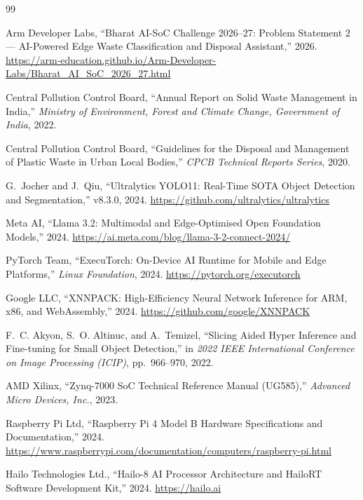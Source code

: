 \documentclass[12pt,a4paper]{article}
\begin{document}
\clearpage

\begin{thebibliography}{99}

Arm Developer Labs,
``Bharat AI-SoC Challenge 2026--27: Problem Statement 2 --- AI-Powered Edge Waste
Classification and Disposal Assistant,'' 2026.
\url{https://arm-education.github.io/Arm-Developer-Labs/Bharat_AI_SoC_2026_27.html}

Central Pollution Control Board,
``Annual Report on Solid Waste Management in India,''
\emph{Ministry of Environment, Forest and Climate Change, Government of India}, 2022.

Central Pollution Control Board,
``Guidelines for the Disposal and Management of Plastic Waste in Urban Local Bodies,''
\emph{CPCB Technical Reports Series}, 2020.

G.~Jocher and J.~Qiu,
``Ultralytics YOLO11: Real-Time SOTA Object Detection and Segmentation,''
v8.3.0, 2024.
\url{https://github.com/ultralytics/ultralytics}

Meta AI,
``Llama 3.2: Multimodal and Edge-Optimised Open Foundation Models,''
2024.
\url{https://ai.meta.com/blog/llama-3-2-connect-2024/}

PyTorch Team,
``ExecuTorch: On-Device AI Runtime for Mobile and Edge Platforms,''
\emph{Linux Foundation}, 2024.
\url{https://pytorch.org/executorch}

Google LLC,
``XNNPACK: High-Efficiency Neural Network Inference for ARM, x86, and WebAssembly,''
2024.
\url{https://github.com/google/XNNPACK}

F.~C. Akyon, S.~O. Altinuc, and A.~Temizel,
``Slicing Aided Hyper Inference and Fine-tuning for Small Object Detection,''
in \emph{2022 IEEE International Conference on Image Processing (ICIP)},
pp.\ 966--970, 2022.

AMD Xilinx,
``Zynq-7000 SoC Technical Reference Manual (UG585),''
\emph{Advanced Micro Devices, Inc.}, 2023.

Raspberry Pi Ltd,
``Raspberry Pi 4 Model B Hardware Specifications and Documentation,''
2024.
\url{https://www.raspberrypi.com/documentation/computers/raspberry-pi.html}

Hailo Technologies Ltd.,
``Hailo-8 AI Processor Architecture and HailoRT Software Development Kit,''
2024.
\url{https://hailo.ai}

\end{thebibliography}
\end{document}
